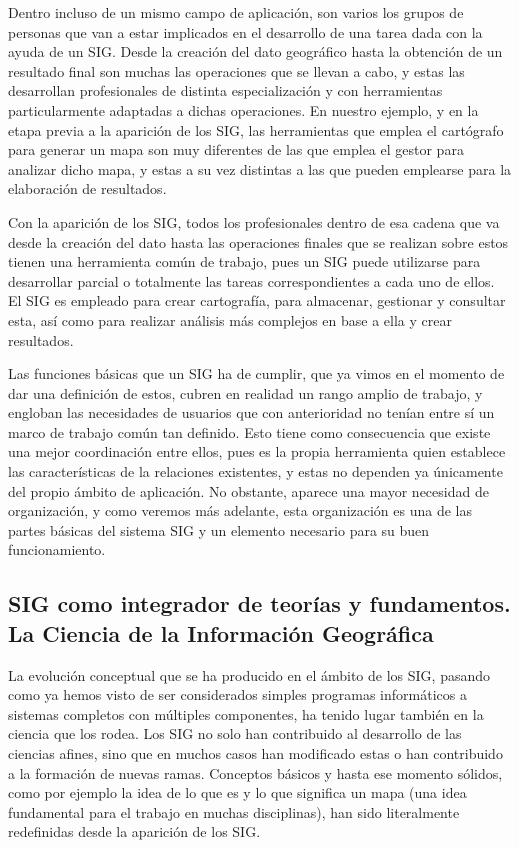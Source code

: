 Dentro incluso de un mismo campo de aplicación, son varios los grupos de personas que van a estar implicados en el desarrollo de una tarea dada con la ayuda de un SIG. Desde la creación del dato geográfico hasta la obtención de un resultado final son muchas las operaciones que se llevan a cabo, y estas las desarrollan profesionales de distinta especialización y con herramientas particularmente adaptadas a dichas operaciones. En nuestro ejemplo, y en la etapa previa a la aparición de los SIG, las herramientas que emplea el cartógrafo para generar un mapa son muy diferentes de las que emplea el gestor para analizar dicho mapa, y estas a su vez distintas a las que pueden emplearse para la elaboración de resultados. 

Con la aparición de los SIG, todos los profesionales dentro de esa cadena que va desde la creación del dato hasta las operaciones finales que se realizan sobre estos tienen una herramienta común de trabajo, pues un SIG puede utilizarse para desarrollar parcial o totalmente las tareas correspondientes a cada uno de ellos. El SIG es empleado para crear cartografía, para almacenar, gestionar y consultar esta, así como para realizar análisis más complejos en base a ella y crear resultados.

Las funciones básicas que un SIG ha de cumplir, que ya vimos en el momento de dar una definición de estos, cubren en realidad un rango amplio de trabajo, y engloban las necesidades de usuarios que con anterioridad no tenían entre sí un marco de trabajo común tan definido. Esto tiene como consecuencia que existe una mejor coordinación entre ellos, pues es la propia herramienta quien establece las características de la relaciones existentes, y estas no dependen ya únicamente del propio ámbito de aplicación. No obstante, aparece una mayor necesidad de organización, y como veremos más adelante, esta organización es una de las partes básicas del sistema SIG y un elemento necesario para su buen funcionamiento.

\subsection[SIG como integrador de teorías y fundamentos]{SIG como integrador de teorías y fundamentos. La Ciencia de la Información Geográfica}

La evolución conceptual que se ha producido en el ámbito de los SIG, pasando como ya hemos visto de ser considerados simples programas informáticos a sistemas completos con múltiples componentes, ha tenido lugar también en la ciencia que los rodea. Los SIG no solo han contribuido al desarrollo de las ciencias afines, sino que en muchos casos han modificado estas o han contribuido a la formación de nuevas ramas. Conceptos básicos y hasta ese momento sólidos,  como por ejemplo la idea de lo que es y lo que significa un mapa (una idea fundamental para el trabajo en muchas disciplinas), han sido literalmente redefinidas desde la aparición de los SIG.

